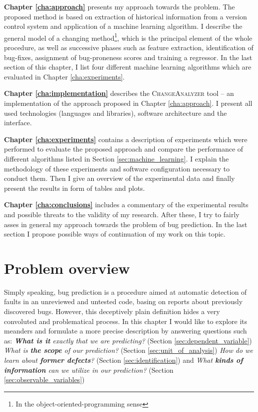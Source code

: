 \documentclass{pracamgr}
\newcommand{\bpar}[1]{\medskip\noindent\textbf{#1}}
\newcommand{\ca}{\textsc{ChangeAnalyzer}\xspace}
\begin{document}
\bpar{Chapter \ref{cha:approach}} presents my approach towards the problem. The proposed method is based on extraction of historical information from a version control system and application of a machine learning algorithm. I describe the general model of a changing method\footnote{In the object-oriented-programming sense}, which is the principal element of the whole procedure, as well as successive phases such as feature extraction, identification of bug-fixes, assignment of bug-proneness scores and training a regressor. In the last section of this chapter, I list four different machine learning algorithms which are evaluated in Chapter \ref{cha:experiments}.

\bpar{Chapter \ref{cha:implementation}} describes the \ca tool -- an implementation of the approach proposed in Chapter \ref{cha:approach}. I present all used technologies (languages and libraries), software architecture and the interface.

\bpar{Chapter \ref{cha:experiments}} contains a description of experiments which were performed to evaluate the proposed approach and compare the performance of different algorithms listed in Section \ref{sec:machine_learning}. I explain the methodology of these experiments and software configuration necessary to conduct them. Then I give an overview of the experimental data and finally present the results in form of tables and plots.

\bpar{Chapter \ref{cha:conclusions}} includes a commentary of the experimental results and possible threats to the validity of my research. After these, I try to fairly asses in general my approach towards the problem of bug prediction. In the last section I propose possible ways of continuation of my work on this topic.

\chapter{Problem overview}
\label{cha:overview}
Simply speaking, bug prediction is a procedure aimed at automatic detection of faults in an unreviewed and untested code, basing on reports about previously discovered bugs. However, this deceptively plain definition hides a very convoluted and problematical process. In this chapter I would like to explore its meanders and formulate a more precise description by answering questions such as: \emph{\textbf{What is it} exactly that we are predicting?} (Section \ref{sec:dependent_variable}) \emph{What is \textbf{the scope} of our prediction?} (Section \ref{sec:unit_of_analysis}) \emph{How do we learn about \textbf{former defects}?} (Section \ref{sec:identification}) and \emph{What \textbf{kinds of information} can we utilize in our prediction?} (Section \ref{sec:observable_variables})
\end{document}
